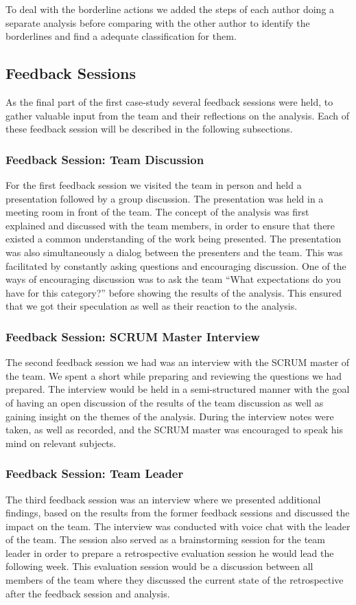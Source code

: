 To deal with the borderline actions we added the steps of each author doing a separate analysis before comparing with the other author to identify the borderlines and find a adequate classification for them.

\subsection{Feedback Sessions}
As the final part of the first case-study several feedback sessions were held, to gather valuable input from the team and their reflections on the analysis. Each of these feedback session will be described in the following subsections. 

\subsubsection{Feedback Session: Team Discussion}
For the first feedback session we visited the team in person and held a presentation followed by a group discussion. The presentation was held in a meeting room in front of the team. The concept of the analysis was first explained and discussed with the team members, in order to ensure that there existed a common understanding of the work being presented. The presentation was also simultaneously a dialog between the presenters and the team. This was facilitated by constantly asking questions and encouraging discussion. One of the ways of encouraging discussion was to ask the team ``What expectations do you have for this category?'' before showing the results of the analysis. This ensured that we got their speculation as well as their reaction to the analysis. 

\subsubsection{Feedback Session: SCRUM Master Interview}
The second feedback session we had was an interview with the SCRUM master of the team. We spent a short while preparing and reviewing the questions we had prepared. The interview would be held in a semi-structured manner with the goal of having an open discussion of the results of the team discussion as well as gaining insight on the themes of the analysis. During the interview notes were taken, as well as recorded, and the SCRUM master was encouraged to speak his mind on relevant subjects. 

\subsubsection{Feedback Session: Team Leader}
The third feedback session was an interview where we presented additional findings, based on the results from the former feedback sessions and discussed the impact on the team. The interview was conducted with voice chat with the leader of the team. The session also served as a brainstorming session for the team leader in order to prepare a retrospective evaluation session he would lead the following week. This evaluation session would be a discussion between all members of the team where they discussed the current state of the retrospective after the feedback session and analysis.

